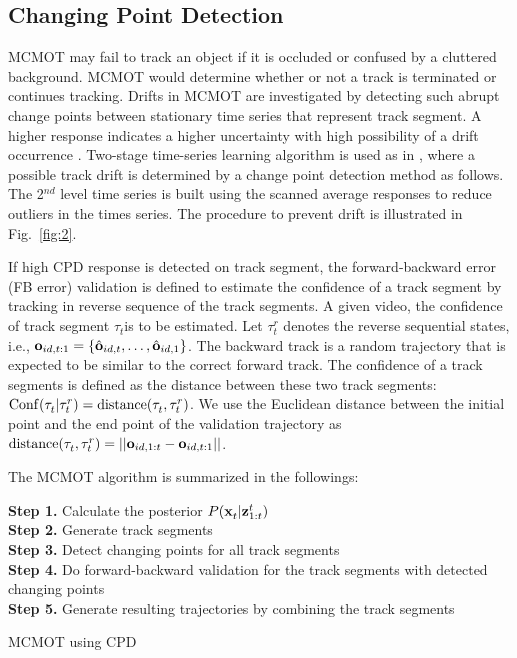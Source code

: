 \documentclass[runningheads]{llncs}
\begin{document}
\subsection{Changing Point Detection}

MCMOT may fail to track an object if it is occluded or confused by a cluttered background. MCMOT would determine whether or not a track is terminated or continues tracking. Drifts in MCMOT are investigated by detecting such abrupt change points between stationary time series that represent track segment. A higher response indicates a higher uncertainty with high possibility of a drift occurrence \cite{Ref25}. Two-stage time-series learning algorithm is used as in \cite{Ref24}, where a possible track drift is determined by a change point detection method \cite{Ref24} as follows. The 2${}^{nd}$ level time series is built using the scanned average responses to reduce outliers in the times series. The procedure to prevent drift is illustrated in Fig.~\ref{fig:2}. 

If high CPD response is detected on track segment, the forward-backward error (FB error) validation \cite{Ref7} is defined to estimate the confidence of a track segment by tracking in reverse sequence of the track segments. A given video, the confidence of track segment \textit{$\tau _{t}^{} $}is to be estimated. Let \textit{$\tau _{t}^{r} $} denotes the reverse sequential states, i.e., ${\bf o}_{id,t:1} ={\rm \{ }\hat{{\bf o}}_{id,t} ,\ldots ,\hat{{\bf o}}_{id,1} {\rm \} }$. The backward track is a random trajectory that is expected to be similar to the correct forward track. The confidence of a track segments is defined as the distance between these two track segments: ${\rm Conf}(\tau _{t}^{} |\tau _{t}^{r} )={\rm distance}(\tau _{t}^{} ,\tau _{t}^{r} )$. We use the Euclidean distance between the initial point and the end point of the validation trajectory as ${\rm distance}(\tau _{t}^{} ,\tau _{t}^{r} )=||{\bf o}_{id,1:t} -{\bf o}_{id,t:1} ||$.

The MCMOT algorithm is summarized in the followings: 
\begin{algorithm}
  \textbf{Step 1.} Calculate the posterior $P{\rm (}{\bf x}_{t}^{} |{\bf z}_{1:t}^{t} {\rm )}$ \\
  \textbf{Step 2.} Generate track segments \\
  \textbf{Step 3.} Detect changing points for all track segments \\ 
  \textbf{Step 4.} Do forward-backward validation for the track segments with detected changing points \\
  \textbf{Step 5.} Generate resulting trajectories by combining the track segments
  \caption{MCMOT using CPD}
\end{algorithm}
\end{document}
